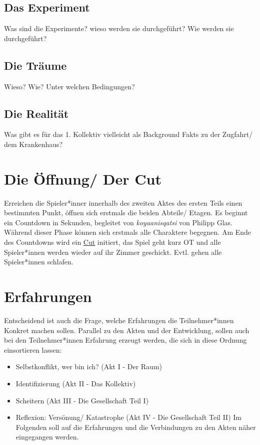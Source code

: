 \documentclass[12pt, a4paper, openany]{report}
\begin{document}
\subsection{Das Experiment}
Was sind die Experimente? wieso werden sie durchgeführt? Wie werden sie durchgeführt?

\subsection{Die Träume}
Wieso? Wie? Unter welchen Bedingungen?

\subsection{Die Realität}
Was gibt es für das 1. Kollektiv vielleicht als Background Fakts zu der Zugfahrt/ dem Krankenhaus?



\section{Die Öffnung/ Der Cut} \label{die-öffnung}
Erreichen die Spieler*inner innerhalb des zweiten Aktes des ersten Teils einen bestimmten Punkt, öffnen sich erstmals die beiden Abteile/ Etagen. 
Es beginnt ein Countdown in Sekunden, begleitet von \textit{koyaanisqatsi} von Philipp Glas. 
Während dieser Phase können sich erstmals alle Charaktere begegnen. 
Am Ende des Countdowns wird ein \hyperref[cut]{Cut} initiert, das Spiel geht kurz OT und alle Spieler*innen werden wieder auf ihr Zimmer geschickt. 
Evtl. gehen alle Spieler*innen schlafen.  

\section{Erfahrungen}
Entscheidend ist auch die Frage, welche Erfahrungen die Teilnehmer*innen Konkret machen sollen.
Parallel zu den Akten und der Entwicklung, sollen auch bei den Teilnehmer*innen Erfahrung erzeugt werden, die sich in diese Ordnung einsortieren lassen:
\begin{itemize}
\item Selbstkonflikt, wer bin ich? (Akt I - Der Raum)
\item Identifizierung (Akt II - Das Kollektiv)
\item Scheitern (Akt III - Die Gesellschaft Teil I)
\item Reflexion: Versönung/ Katastrophe (Akt IV - Die Gesellschaft Teil II)
Im Folgenden soll auf die Erfahrungen und die Verbindungen zu den Akten näher eingegangen werden.
\end{itemize}
\end{document}
